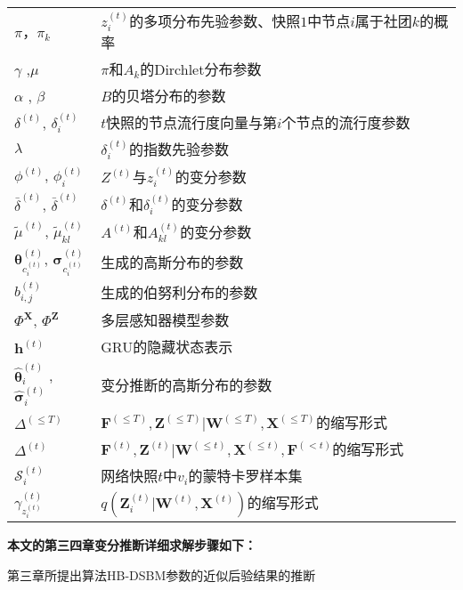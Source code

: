 \begin{center}
\begin{longtable}{@{}lp{300pt}@{}}
			$\pi$，$\pi_k$ & $z^{(t)}_i$的多项分布先验参数、快照$1$中节点$i$属于社团$k$的概率\\
			${\gamma}$ ,${\mu}$ & ${\pi}$和${A}_k$的Dirchlet分布参数 \\
			${\alpha}$ , ${\beta}$ & $B$的贝塔分布的参数 \\   
			$\delta^{(t)}$, $\delta_i^{(t)}$ & $t$快照的节点流行度向量与第$i$个节点的流行度参数 \\
			$\lambda$ & $\delta_i^{(t)}$的指数先验参数 \\
			$\phi^{(t)}$, $\phi^{(t)}_i$ &$Z^{(t)}$与$z^{(t)}_i$的变分参数 \\
			$\bar{\delta}^{(t)}$, $\bar{\delta}^{(t)}$ &$\delta^{(t)}$和$\delta^{(t)}_i$的变分参数 \\
			$\tilde{\mu}^{(t)}$, $\tilde{\mu}^{(t)}_{kl}$ &$A^{(t)}$和$A^{(t)}_{kl}$的变分参数 \\
			$\bm{\theta}_{c_i^{(t)}}^{(t)}$, $\bm{\sigma}_{c_i^{(t)}}^{(t)}$ & 生成的高斯分布的参数\\
			$b_{i,j}^{(t)}$ &  生成的伯努利分布的参数 \\
			$\Phi^{\mathbf{X}}$, $\Phi^{\mathbf{Z}}$& 多层感知器模型参数\\
			$\mathbf{h}^{(t)}$ & GRU的隐藏状态表示 \\
			$\hat{\bm{\theta}}^{(t)}_i$ , $\hat{\bm{\sigma}}^{(t)}_i$ & 变分推断的高斯分布的参数 \\
			$\Delta^{(\leq T)}$ & $\mathbf{F}^{(\leq T)}, \mathbf{Z}^{(\leq T)}|\mathbf{W}^{(\leq T)},\mathbf{X}^{(\leq T)}$的缩写形式 \\
			$\Delta^{(t)}$ & $\mathbf{F}^{(t)}, \mathbf{Z}^{(t)}|\mathbf{W}^{(\leq t)},\mathbf{X}^{(\leq t)},\mathbf{F}^{(< t)}$的缩写形式\\
			$\mathcal{S}_i^{(t)}$ & 网络快照$t$中$v_i$的蒙特卡罗样本集 \\
			$\gamma_{z_i^{(t)}}^{(t)}$ & $q(\mathbf{Z}_i^{(t)}|\mathbf{W}^{(t)},\mathbf{X}^{(t)})$的缩写形式 \\
			\hline
	\end{longtable}
\end{center}

\textbf{本文的第三四章变分推断详细求解步骤如下：}
\begin{proposition}
	第三章所提出算法HB-DSBM参数的近似后验结果的推断
\end{proposition}


